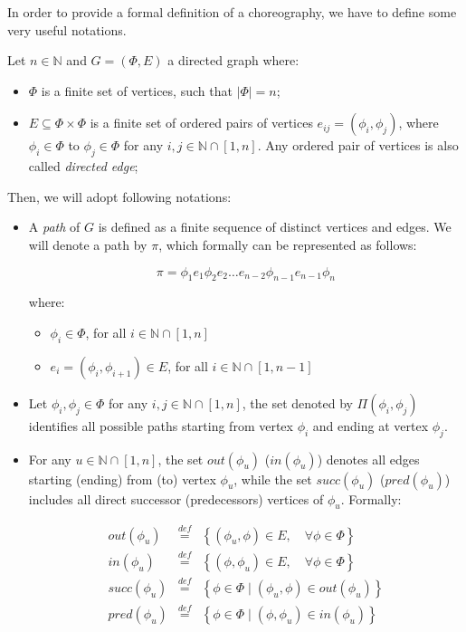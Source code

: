 \documentclass[12pt,a4paper]{report}
\newcommand{\mathDef}{\overset{\textit{def}}{=}}
\newcommand{\N}{\mathbb{N}}
\begin{document}
In order to provide a formal definition of a choreography, we have to define some very useful notations. 

Let $n \in \N$ and $G = (\Phi,E)$ a directed graph where:

\begin{itemize}
	\item $\Phi$ is a finite set of vertices, such that $|\Phi| = n$;
	\item  $E \subseteq \Phi \times \Phi $ is a finite set of ordered pairs of vertices $e_{ij} = \left( \phi_i, \phi_j \right)$, where $\phi_i \in \Phi$ to $\phi_j \in \Phi$ for any $i,j \in \N \cap \left[ 1, n \right]$. Any ordered pair of vertices is also called \textit{directed edge};
\end{itemize}

Then, we will adopt following notations:

\begin{itemize}
	\item A \textit{path} of $G$ is defined as a finite sequence of distinct vertices and edges. We will denote a path by $\pi$, which formally can be represented as follows:
	
	\begin{equation}
		\pi = \phi_1 e_1 \phi_2 e_2 \ldots e_{n-2}\phi_{n-1} e_{n-1} \phi_n
	\end{equation}
	
	where:
	
	\begin{itemize}
		\item $\phi_i \in \Phi$, for all $i \in \N \cap \left[ 1, n \right]$
		\item $e_i = \left( \phi_i, \phi_{i+1} \right) \in E$, for all $i \in \N \cap \left[ 1, n-1 \right]$
	\end{itemize}
	
	\item Let $\phi_i,\phi_j \in \Phi$ for any $i,j \in \N \cap \left[ 1, n \right]$, the set denoted by $\Pi(\phi_i, \phi_j)$ identifies all possible paths starting from vertex $\phi_i$ and ending at vertex $\phi_j$.
	
	\item For any $u \in \N \cap \left[ 1, n \right]$, the set $out(\phi_u)$ ($in(\phi_u)$) denotes all edges starting (ending) from (to) vertex $\phi_u$, while the set $succ(\phi_u)$ ($pred(\phi_u)$) includes all direct successor (predecessors) vertices of $\phi_u$. Formally:
	
	\begin{eqnarray}\label{outDef}
		out(\phi_u) & \mathDef & \left\lbrace (\phi_u, \phi) \in E, \quad \forall \phi \in \Phi  \right\rbrace \\
		in(\phi_u) & \mathDef & \left\lbrace (\phi, \phi_u) \in E, \quad \forall \phi \in \Phi  \right\rbrace \\
		succ(\phi_u) & \mathDef & \left\lbrace \phi \in \Phi \mid (\phi_u, \phi) \in out(\phi_u)  \right\rbrace \\
		pred(\phi_u) & \mathDef & \left\lbrace \phi \in \Phi \mid (\phi, \phi_u) \in in(\phi_u)  \right\rbrace 
	\end{eqnarray}
\end{itemize}
\end{document}
